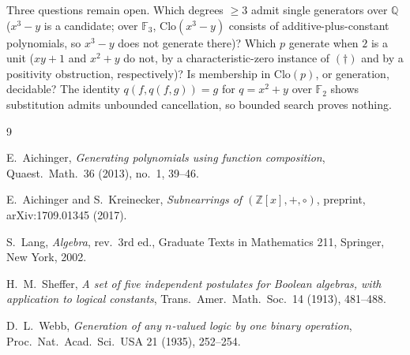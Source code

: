 \documentclass[11pt]{article}
\theoremstyle{definition}
\newcommand{\F}{\mathbb{F}}
\newcommand{\Z}{\mathbb{Z}}
\newcommand{\Q}{\mathbb{Q}}
\newcommand{\Clo}{\mathrm{Clo}}
\begin{document}
Three questions remain open.  Which degrees $\geq 3$ admit single
generators over $\Q$ ($x^3 - y$ is a candidate; over $\F_3$,
$\Clo(x^3 - y)$ consists of additive-plus-constant polynomials, so
$x^3 - y$ does not generate there)?  Which $p$ generate when $2$ is a
unit ($xy + 1$ and $x^2 + y$ do not, by a characteristic-zero
instance of $(\dagger)$ and by a positivity obstruction,
respectively)?  Is membership in $\Clo(p)$, or generation,
decidable?  The identity
$q(f, q(f,g)) = g$ for $q = x^2 + y$ over $\F_2$ shows substitution
admits unbounded cancellation, so bounded search proves nothing.

\begin{thebibliography}{9}

 E.~Aichinger, \emph{Generating polynomials
using function composition}, Quaest.\ Math.\ 36 (2013), no.~1,
39--46.

 E.~Aichinger and S.~Kreinecker,
\emph{Subnearrings of $(\Z[x], +, \circ)$}, preprint,
arXiv:1709.01345 (2017).

 S.~Lang, \emph{Algebra}, rev.\ 3rd ed., Graduate Texts
in Mathematics 211, Springer, New York, 2002.

 H.~M.~Sheffer, \emph{A set of five independent
postulates for Boolean algebras, with application to logical
constants}, Trans.\ Amer.\ Math.\ Soc.\ 14 (1913), 481--488.

 D.~L.~Webb, \emph{Generation of any $n$-valued logic
by one binary operation}, Proc.\ Nat.\ Acad.\ Sci.\ USA 21 (1935),
252--254.

\end{thebibliography}
\end{document}
